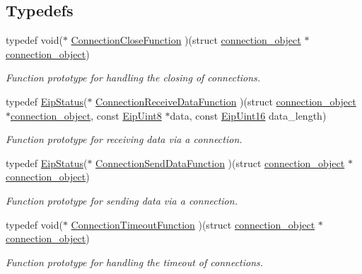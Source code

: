 \subsection*{\-Typedefs}
\begin{DoxyCompactItemize}
\item 
typedef void($\ast$ \hyperlink{group__CIP__API_ga754f77d4872724e212cf1d9d7d84d406}{\-Connection\-Close\-Function} )(struct \hyperlink{structconnection__object}{connection\-\_\-object} $\ast$\hyperlink{structconnection__object}{connection\-\_\-object})
\begin{DoxyCompactList}\small\item\em \-Function prototype for handling the closing of connections. \end{DoxyCompactList}\item 
typedef \hyperlink{typedefs_8h_a3dcc5f7837c120360f8cc88a76781709}{\-Eip\-Status}($\ast$ \hyperlink{group__CIP__API_gaac5ac35ed35317f29e3455e92f450623}{\-Connection\-Receive\-Data\-Function} )(struct \hyperlink{structconnection__object}{connection\-\_\-object} $\ast$\hyperlink{structconnection__object}{connection\-\_\-object}, const \hyperlink{typedefs_8h_aa0c108ee762a27720919a4634643040e}{\-Eip\-Uint8} $\ast$data, const \hyperlink{typedefs_8h_ac1b4cfa25b4f5def62f23b455dd395d8}{\-Eip\-Uint16} data\-\_\-length)
\begin{DoxyCompactList}\small\item\em \-Function prototype for receiving data via a connection. \end{DoxyCompactList}\item 
typedef \hyperlink{typedefs_8h_a3dcc5f7837c120360f8cc88a76781709}{\-Eip\-Status}($\ast$ \hyperlink{group__CIP__API_gaa870412e93039a338e73edc08e9cd68a}{\-Connection\-Send\-Data\-Function} )(struct \hyperlink{structconnection__object}{connection\-\_\-object} $\ast$\hyperlink{structconnection__object}{connection\-\_\-object})
\begin{DoxyCompactList}\small\item\em \-Function prototype for sending data via a connection. \end{DoxyCompactList}\item 
typedef void($\ast$ \hyperlink{group__CIP__API_gaffa28b7ae343af7c7d1c7c52d83bbbee}{\-Connection\-Timeout\-Function} )(struct \hyperlink{structconnection__object}{connection\-\_\-object} $\ast$\hyperlink{structconnection__object}{connection\-\_\-object})
\begin{DoxyCompactList}\small\item\em \-Function prototype for handling the timeout of connections. \end{DoxyCompactList}\item 

\end{DoxyCompactItemize}
